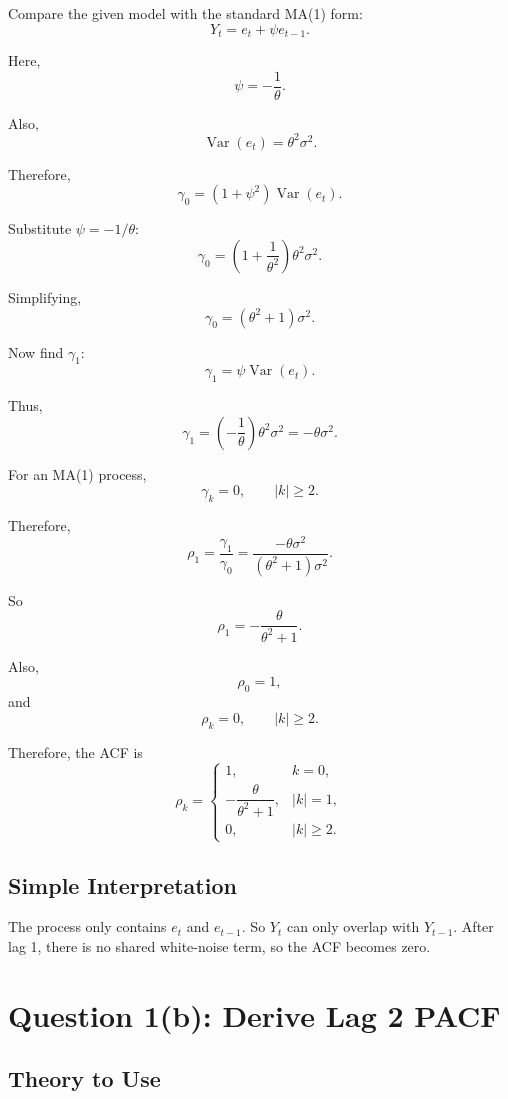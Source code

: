 \documentclass[12pt]{article}
\begin{document}
Compare the given model with the standard MA(1) form:
\[
Y_t = e_t + \psi e_{t-1}.
\]

Here,
\[
\psi = -\frac{1}{\theta}.
\]

Also,
\[
\operatorname{Var}(e_t)=\theta^2\sigma^2.
\]

Therefore,
\[
\gamma_0
=
\left(1+\psi^2\right)\operatorname{Var}(e_t).
\]

Substitute \(\psi=-1/\theta\):
\[
\gamma_0
=
\left(1+\frac{1}{\theta^2}\right)\theta^2\sigma^2.
\]

Simplifying,
\[
\gamma_0
=
(\theta^2+1)\sigma^2.
\]

Now find \(\gamma_1\):
\[
\gamma_1
=
\psi \operatorname{Var}(e_t).
\]

Thus,
\[
\gamma_1
=
\left(-\frac{1}{\theta}\right)\theta^2\sigma^2
=
-\theta\sigma^2.
\]

For an MA(1) process,
\[
\gamma_k=0,\qquad |k|\geq 2.
\]

Therefore,
\[
\rho_1
=
\frac{\gamma_1}{\gamma_0}
=
\frac{-\theta\sigma^2}{(\theta^2+1)\sigma^2}.
\]

So
\[
\boxed{\rho_1=-\frac{\theta}{\theta^2+1}}.
\]

Also,
\[
\boxed{\rho_0=1},
\]
and
\[
\boxed{\rho_k=0,\qquad |k|\geq 2}.
\]

Therefore, the ACF is
\[
\boxed{
\rho_k =
\begin{cases}
1, & k=0,\\[4pt]
-\dfrac{\theta}{\theta^2+1}, & |k|=1,\\[8pt]
0, & |k|\geq 2.
\end{cases}
}
\]

\subsection*{Simple Interpretation}

The process only contains \(e_t\) and \(e_{t-1}\).  So \(Y_t\) can only overlap
with \(Y_{t-1}\).  After lag 1, there is no shared white-noise term, so the ACF
becomes zero.

\section*{Question 1(b): Derive Lag 2 PACF}

\subsection*{Theory to Use}
\end{document}
